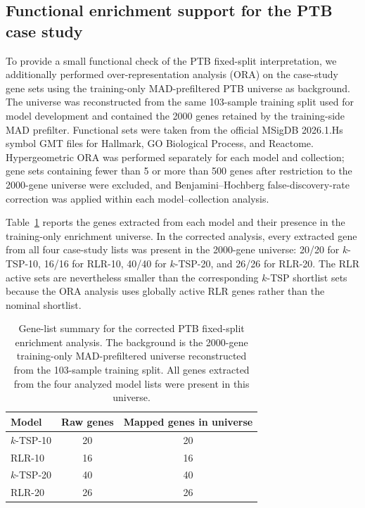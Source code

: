 \documentclass[11pt, a4paper]{article}
\newcommand{\stdtablefont}{\small}
\newcommand{\stdtablelayout}{%
  \stdtablefont
  \setlength{\tabcolsep}{4pt}
  \renewcommand{\arraystretch}{1.2}
}
\begin{document}
\subsection{Functional enrichment support for the PTB case study}

To provide a small functional check of the PTB fixed-split interpretation, we additionally performed over-representation analysis (ORA) on the case-study gene sets using the training-only MAD-prefiltered PTB universe as background. The universe was reconstructed from the same 103-sample training split used for model development and contained the 2000 genes retained by the training-side MAD prefilter. Functional sets were taken from the official MSigDB 2026.1.Hs symbol GMT files for Hallmark, GO Biological Process, and Reactome. Hypergeometric ORA was performed separately for each model and collection; gene sets containing fewer than 5 or more than 500 genes after restriction to the 2000-gene universe were excluded, and Benjamini--Hochberg false-discovery-rate correction was applied within each model--collection analysis.

Table~\ref{tab:ptb_ora_gene_lists} reports the genes extracted from each model and their presence in the training-only enrichment universe. In the corrected analysis, every extracted gene from all four case-study lists was present in the 2000-gene universe: 20/20 for $k$-TSP-10, 16/16 for RLR-10, 40/40 for $k$-TSP-20, and 26/26 for RLR-20. The RLR active sets are nevertheless smaller than the corresponding $k$-TSP shortlist sets because the ORA analysis uses globally active RLR genes rather than the nominal shortlist.

\begin{table}[!htbp]
\centering
\caption{Gene-list summary for the corrected PTB fixed-split enrichment analysis. The background is the 2000-gene training-only MAD-prefiltered universe reconstructed from the 103-sample training split. All genes extracted from the four analyzed model lists were present in this universe.}
\label{tab:ptb_ora_gene_lists}
{\stdtablelayout
\begin{tabular}{lcc}
\toprule
\textbf{Model} & \textbf{Raw genes} & \textbf{Mapped genes in universe} \\
\midrule
$k$-TSP-10 & 20 & 20 \\
RLR-10     & 16 & 16 \\
$k$-TSP-20 & 40 & 40 \\
RLR-20     & 26 & 26 \\
\bottomrule
\end{tabular}
}
\end{table}
\end{document}
